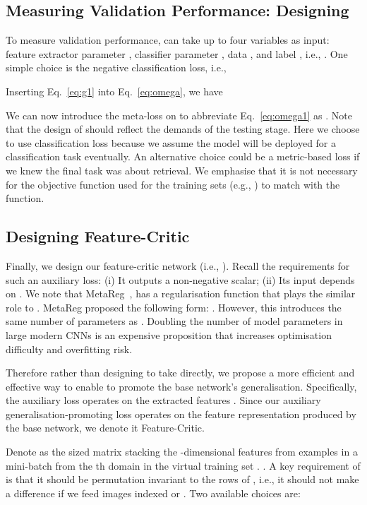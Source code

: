 \documentclass{article}
\newcommand{\modelname}{Feature-Critic}
\begin{document}
\subsection{Measuring Validation Performance: Designing }
\label{sec:g}
To measure validation performance,  can take up to four variables as input: feature extractor parameter , classifier parameter , data , and label , i.e., . One simple choice is the negative classification loss, i.e.,

\noindent Inserting Eq.~\ref{eq:g1} into Eq.~\ref{eq:omega}, we have

We can now introduce the meta-loss  on  to abbreviate Eq.~\ref{eq:omega1} as .
Note that the design of  should reflect the demands of the testing stage. Here we choose to use classification loss because we assume the model will be deployed for a classification task eventually. An alternative choice could be a metric-based loss if we knew the final task was about retrieval. We emphasise that it is not necessary for the objective function used for the training sets (e.g., ) to match with the  function.

\subsection{Designing Feature-Critic }
\label{sec:h}
Finally, we design our feature-critic network  (i.e., ). Recall the requirements for such an auxiliary loss: (i) It outputs a non-negative scalar; (ii) Its input depends on . We note that MetaReg~\cite{Balaji18}, has a regularisation function that plays the similar role to . MetaReg proposed the following form: . However, this introduces the same number of parameters as . Doubling the number of model parameters in large modern CNNs is an expensive proposition that increases optimisation difficulty and overfitting risk. 

Therefore rather than designing  to take  directly, we propose a more efficient and effective way to enable  to promote the base network's generalisation. Specifically, the auxiliary loss operates on the extracted features . Since our auxiliary generalisation-promoting loss operates on the feature representation produced by the base network, we denote it \modelname. 

Denote  as the   sized matrix stacking the -dimensional features from  examples in a mini-batch from the th domain in the virtual training set  . . A key requirement of  is that it should be permutation invariant to the rows of , i.e., it should not make a difference if we feed images indexed  or . Two available choices are:
\end{document}
